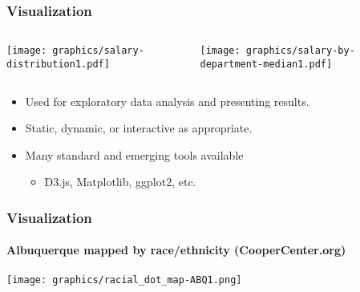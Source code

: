 \begin{frame}
\frametitle{Visualization}

\begin{center}


\begin{columns}

\begin{column}{0.4\textwidth}
\begin{center}
\texttt{[image: graphics/salary-distribution1.pdf]}
\end{center}
\end{column}

\begin{column}{0.6\textwidth}
\texttt{[image: graphics/salary-by-department-median1.pdf]}
\end{column}

\end{columns}

\bigskip

\begin{itemize}
\item Used for exploratory data analysis and presenting results.
\item Static, dynamic, or interactive as appropriate.
\item Many standard and emerging tools available
\begin{itemize}
\item D3.js, Matplotlib, ggplot2, etc.
\end{itemize}
\end{itemize}

\end{center}

\end{frame}


\begin{frame}
\frametitle{Visualization}
\framesubtitle{Albuquerque mapped by race/ethnicity (CooperCenter.org)}

\begin{center}

\texttt{[image: graphics/racial\_dot\_map-ABQ1.png]}


\end{center}

\end{frame}


